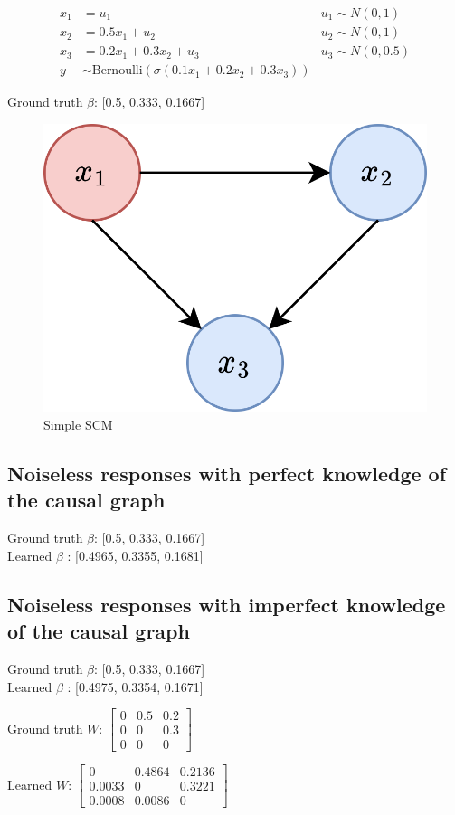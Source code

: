 \begin{align}
	x_1 & = u_1 & u_1 \sim N(0,1) \\ \nonumber
	x_2 & = 0.5x_1 + u_2 & u_2 \sim N(0,1) \\ \nonumber
	x_3 & = 0.2x_1 + 0.3x_2 + u_3 & u_3 \sim N(0,0.5) \\ \nonumber
	y   & \sim \text{Bernoulli}(\sigma(0.1x_1 + 0.2x_2 + 0.3x_3))
\end{align}

Ground truth $\beta$: [0.5, 0.333, 0.1667]


\begin{figure}[!htb]
	\centering
	\includegraphics[width=0.4\linewidth]{images/draw.io/toy_scm.png}
	\caption{Simple SCM}
	\label{fig:simple_scm}
\end{figure}


\subsection{Noiseless responses with perfect knowledge of the causal graph}

Ground truth $\beta$: [0.5, 0.333, 0.1667] \\
Learned $\beta$ : [0.4965, 0.3355, 0.1681]

\subsection{Noiseless responses with imperfect knowledge of the causal graph}

Ground truth $\beta$: [0.5, 0.333, 0.1667] \\
Learned $\beta$ : [0.4975, 0.3354, 0.1671]

Ground truth $W$: $\begin{bmatrix}
	0 & 0.5 & 0.2 \\
	0 & 0 & 0.3 \\
	0 & 0 & 0
\end{bmatrix}$

Learned $W$: $\begin{bmatrix}
	0 & 0.4864 & 0.2136 \\
	0.0033 & 0 & 0.3221 \\
	0.0008 & 0.0086 & 0
\end{bmatrix}$


